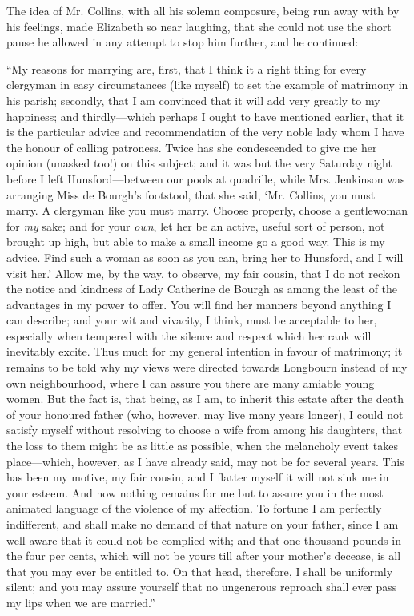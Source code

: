 The idea of Mr. Collins, with all his solemn composure, being run away with by his feelings, made Elizabeth so near laughing, that she could not use the short pause he allowed in any attempt to stop him further, and he continued:

“My reasons for marrying are, first, that I think it a right thing for every clergyman in easy circumstances (like myself) to set the example of matrimony in his parish; secondly, that I am convinced that it will add very greatly to my happiness; and thirdly---which perhaps I ought to have mentioned earlier, that it is the particular advice and recommendation of the very noble lady whom I have the honour of calling patroness. Twice has she condescended to give me her opinion (unasked too!) on this subject; and it was but the very Saturday night before I left Hunsford---between our pools at quadrille, while Mrs. Jenkinson was arranging Miss de Bourgh's footstool, that she said, ‘Mr. Collins, you must marry. A clergyman like you must marry. Choose properly, choose a gentlewoman for {\em my} sake; and for your {\em own}, let her be an active, useful sort of person, not brought up high, but able to make a small income go a good way. This is my advice. Find such a woman as soon as you can, bring her to Hunsford, and I will visit her.' Allow me, by the way, to observe, my fair cousin, that I do not reckon the notice and kindness of Lady Catherine de Bourgh as among the least of the advantages in my power to offer. You will find her manners beyond anything I can describe; and your wit and vivacity, I think, must be acceptable to her, especially when tempered with the silence and respect which her rank will inevitably excite. Thus much for my general intention in favour of matrimony; it remains to be told why my views were directed towards Longbourn instead of my own neighbourhood, where I can assure you there are many amiable young women. But the fact is, that being, as I am, to inherit this estate after the death of your honoured father (who, however, may live many years longer), I could not satisfy myself without resolving to choose a wife from among his daughters, that the loss to them might be as little as possible, when the melancholy event takes place---which, however, as I have already said, may not be for several years. This has been my motive, my fair cousin, and I flatter myself it will not sink me in your esteem. And now nothing remains for me but to assure you in the most animated language of the violence of my affection. To fortune I am perfectly indifferent, and shall make no demand of that nature on your father, since I am well aware that it could not be complied with; and that one thousand pounds in the four per cents, which will not be yours till after your mother's decease, is all that you may ever be entitled to. On that head, therefore, I shall be uniformly silent; and you may assure yourself that no ungenerous reproach shall ever pass my lips when we are married.”

